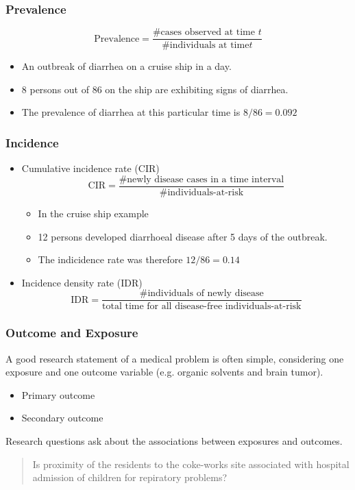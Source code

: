 \documentclass[table,10pt]{beamer}
\begin{document}
\begin{CJK*}{UTF8}{gbsn}
\begin{frame}[t]
\frametitle{Prevalence}
$$
\textrm{Prevalence} = \frac{\mbox{\#cases observed at time } t}{\mbox{\#individuals at time} t}
$$
\begin{itemize}
	\item An outbreak of diarrhea on a cruise ship in a day.
	\item 8 persons out of 86 on the ship are exhibiting signs of diarrhea.
	\item The prevalence of diarrhea at this particular time is $8/86=0.092$
\end{itemize}
\end{frame}

\begin{frame}[t]
\frametitle{Incidence}
\begin{itemize}
	\item Cumulative incidence rate (CIR)
	$$
\textrm{CIR} = \frac{\mbox{\#newly disease cases in a time interval}}{\mbox{\#individuals-at-risk}}
	$$
	\begin{itemize}
		\item In the cruise ship example
		\item 12 persons developed diarrhoeal disease after 5 days of the outbreak.
		\item The indicidence rate was therefore $12/86=0.14$
	\end{itemize}
	\item Incidence density rate (IDR)
	$$
\textrm{IDR} = \frac{\mbox{\#individuals of newly disease}}{\mbox{total time for all disease-free individuals-at-risk}}
	$$
\end{itemize}
\end{frame}

\begin{frame}
\frametitle{Outcome and Exposure}
A good research statement of a medical problem is often simple, considering one 
exposure and one outcome variable (e.g. organic solvents and brain tumor).

\begin{itemize}
	\item Primary outcome
	\item Secondary outcome
\end{itemize}

Research questions ask about the associations between exposures and outcomes. 
\begin{quote}
Is proximity of the residents to the coke-works site associated with hospital 
admission of children for repiratory problems?
\end{quote}


\end{frame}
\end{CJK*}
\end{document}
